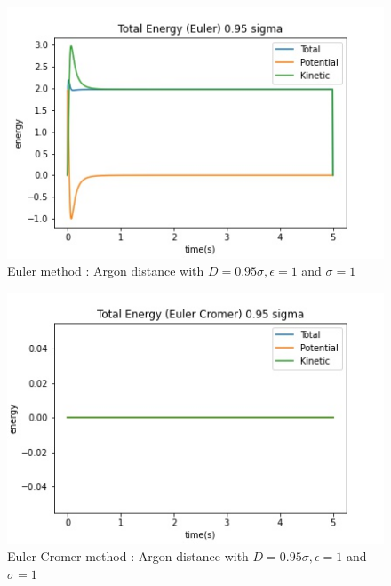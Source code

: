 \begin{figure}[h!]
        \centering 
        \includegraphics[scale=0.8]{./py/2civ_allEnergiesEuler095.jpg} 
        \caption{Euler  method : Argon distance with $D = 0.95 \sigma, \epsilon = 1$ and $\sigma = 1$ }
        \label{fig:allEuler95}
\end{figure}


\begin{figure}[h!]
        \centering 
        \includegraphics[scale=0.8]{./py/2civ_allEnergiesEulerCromer095.jpg} 
        \caption{Euler Cromer  method : Argon distance with $D = 0.95 \sigma, \epsilon = 1$ and $\sigma = 1$ }
        \label{fig:allEulerCromer95}
\end{figure}


